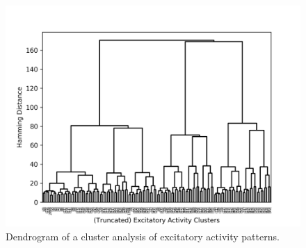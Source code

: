 \documentclass[10pt,a4paper]{article}
\begin{document}
\begin{figure}
\includegraphics[width=\textwidth]{../plots/act_dendrogram.png}
\caption{\label{fig:act_dendrogram} Dendrogram of a cluster analysis of excitatory activity patterns.}
\end{figure}
\end{document}
